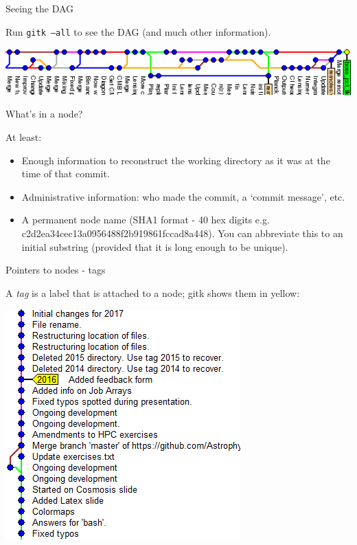 \documentclass[usenames,dvipsnames]{beamer}
\newcommand{\code}[1]{\colorbox{light-gray}{\texttt{#1}}}
\begin{document}
\begin{frame}{Seeing the DAG}
  \begin{block}{}
  Run \code{gitk --all} to see the DAG (and much other information).
    \begin{center}
      \includegraphics[scale=0.8]{DAG.png}
    \end{center}
  \end{block}
\end{frame}


\begin{frame}{What's in a node?}
  \begin{block}{}
    At least:
    \begin{itemize}
      \item{Enough information to reconstruct the working directory as it was at the time of that commit.}
      \item{Administrative information: who made the commit, a `commit message', etc.}
      \item{A permanent node name (SHA1 format - 40 hex digits e.g. c2d2ea34cec13a0956488f2b919861fccad8a448). You can abbreviate this to an initial substring (provided that it is long enough to be unique).}
    \end{itemize}
  \end{block}
\end{frame}

\begin{frame}{Pointers to nodes - tags}
  \begin{block}{}
    A \textit{tag} is a label that is attached to a node; gitk shows them in yellow:
    \begin{center}
      \includegraphics[scale=0.6]{Tag.png}
    \end{center}
  \end{block}
\end{frame}
  
\end{document}
